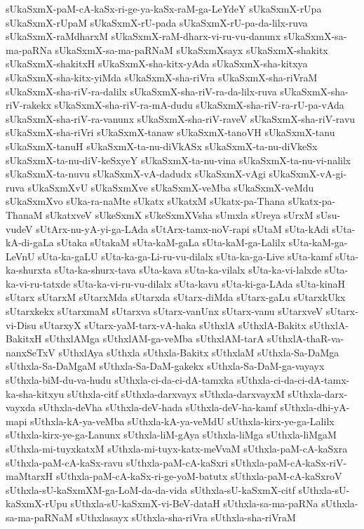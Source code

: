 {sUkaSxmX-paM-cA-kaSx-ri-ge-ya-kaSx-raM-ga-LeYdeY
sUkaSxmX-rUpa
sUkaSxmX-rUpaM
sUkaSxmX-rU-pada
sUkaSxmX-rU-pa-da-lilx-ruva
sUkaSxmX-raMdharxM
sUkaSxmX-raM-dharx-vi-ru-vu-danunx
sUkaSxmX-sa-ma-paRNa
sUkaSxmX-sa-ma-paRNaM
sUkaSxmXsayx
sUkaSxmX-shakitx
sUkaSxmX-shakitxH
sUkaSxmX-sha-kitx-yAda
sUkaSxmX-sha-kitxya
sUkaSxmX-sha-kitx-yiMda
sUkaSxmX-sha-riVra
sUkaSxmX-sha-riVraM
sUkaSxmX-sha-riV-ra-dalilx
sUkaSxmX-sha-riV-ra-da-lilx-ruva
sUkaSxmX-sha-riV-rakekx
sUkaSxmX-sha-riV-ra-mA-dudu
sUkaSxmX-sha-riV-ra-rU-pa-vAda
sUkaSxmX-sha-riV-ra-vanunx
sUkaSxmX-sha-riV-raveV
sUkaSxmX-sha-riV-ravu
sUkaSxmX-sha-riVri
sUkaSxmX-tanaw
sUkaSxmX-tanoVH
sUkaSxmX-tanu
sUkaSxmX-tanuH
sUkaSxmX-ta-nu-diVkASx
sUkaSxmX-ta-nu-diVkeSx
sUkaSxmX-ta-nu-diV-keSxyeY
sUkaSxmX-ta-nu-vina
sUkaSxmX-ta-nu-vi-nalilx
sUkaSxmX-ta-nuvu
sUkaSxmX-vA-dadudx
sUkaSxmX-vAgi
sUkaSxmX-vA-gi-ruva
sUkaSxmXvU
sUkaSxmXve
sUkaSxmX-veMba
sUkaSxmX-veMdu
sUkaSxmXvo
sUka-ra-naMte
sUkatx
sUkatxM
sUkatx-pa-Thana
sUkatx-pa-ThanaM
sUkatxveV
sUkeSxmX
sUkeSxmXVsha
sUmxla
sUreya
sUrxM
sUsu-vudeV
sUtArx-nu-yA-yi-ga-LAda
sUtArx-tamx-noV-rapi
sUtaM
sUta-kAdi
sUta-kA-di-gaLa
sUtaka
sUtakaM
sUta-kaM-gaLa
sUta-kaM-ga-Lalilx
sUta-kaM-ga-LeVnU
sUta-ka-gaLU
sUta-ka-ga-Li-ru-vu-dilalx
sUta-ka-ga-Live
sUta-kamf
sUta-ka-shurxta
sUta-ka-shurx-tava
sUta-kava
sUta-ka-vilalx
sUta-ka-vi-lalxde
sUta-ka-vi-ru-tatxde
sUta-ka-vi-ru-vu-dilalx
sUta-kavu
sUta-ki-ga-LAda
sUta-kinaH
sUtarx
sUtarxM
sUtarxMda
sUtarxda
sUtarx-diMda
sUtarx-gaLu
sUtarxkUkx
sUtarxkekx
sUtarxmaM
sUtarxva
sUtarx-vanUnx
sUtarx-vanu
sUtarxveV
sUtarx-vi-Disu
sUtarxyX
sUtarx-yaM-tarx-vA-haka
sUthxlA
sUthxlA-Bakitx
sUthxlA-BakitxH
sUthxlAMga
sUthxlAM-ga-veMba
sUthxlAM-tarA
sUthxlA-thaR-va-nanxSeTxV
sUthxlAya
sUthxla
sUthxla-Bakitx
sUthxlaM
sUthxla-Sa-DaMga
sUthxla-Sa-DaMgaM
sUthxla-Sa-DaM-gakekx
sUthxla-Sa-DaM-ga-vayayx
sUthxla-biM-du-va-hudu
sUthxla-ci-da-ci-dA-tamxka
sUthxla-ci-da-ci-dA-tamx-ka-sha-kitxyu
sUthxla-citf
sUthxla-darxvayx
sUthxla-darxvayxM
sUthxla-darx-vayxda
sUthxla-deVha
sUthxla-deV-hada
sUthxla-deV-ha-kamf
sUthxla-dhi-yA-mapi
sUthxla-kA-ya-veMba
sUthxla-kA-ya-veMdU
sUthxla-kirx-ye-ga-Lalilx
sUthxla-kirx-ye-ga-Lanunx
sUthxla-liM-gAya
sUthxla-liMga
sUthxla-liMgaM
sUthxla-mi-tuyxkatxM
sUthxla-mi-tuyx-katx-meVvaM
sUthxla-paM-cA-kaSxra
sUthxla-paM-cA-kaSx-ravu
sUthxla-paM-cA-kaSxri
sUthxla-paM-cA-kaSx-riV-maMtarxH
sUthxla-paM-cA-kaSx-ri-ge-yoM-batutx
sUthxla-paM-cA-kaSxroV
sUthxla-sU-kaSxmXM-ga-LoM-da-da-vida
sUthxla-sU-kaSxmX-citf
sUthxla-sU-kaSxmX-rUpu
sUthxla-sU-kaSxmX-vi-BeV-dataH
sUthxla-sa-ma-paRNa
sUthxla-sa-ma-paRNaM
sUthxlasayx
sUthxla-sha-riVra
sUthxla-sha-riVraM
}
